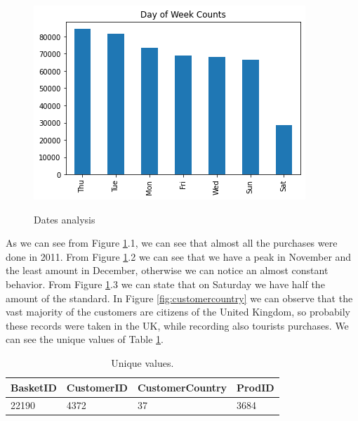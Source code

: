 \documentclass[12pt]{article}
\begin{document}
\begin{figure}[!h]
  \includegraphics[width=\linewidth]{images/data3.png}
 \label{fig:data3}
\endminipage
\caption{Dates analysis}
\label{fig:triade}
\end{figure}

As we can see from Figure \ref{fig:triade}.1, we can see that almost all the purchases were done in 2011. From Figure \ref{fig:triade}.2 we can see that we have a  peak in November and the least amount in December, otherwise we can notice an almost constant behavior. From Figure \ref{fig:triade}.3 we can state that on Saturday we have half the amount of the standard.
In Figure \ref{fig:customercountry} we can observe that the vast majority of the customers are citizens of the United Kingdom, so probabily these records were taken in the UK, while recording also tourists purchases. We can see the unique values of Table \ref{table:unique_val}.

\begin{table}[h]
\centering
    \begin{tabular}{@{}llll@{}}
    \toprule
    BasketID & CustomerID & CustomerCountry & ProdID \\ \midrule
    22190 & 4372 & 37 & 3684 \\ \bottomrule
    \end{tabular}
\caption{Unique values.}
\label{table:unique_val}
\end{table}
\end{document}
